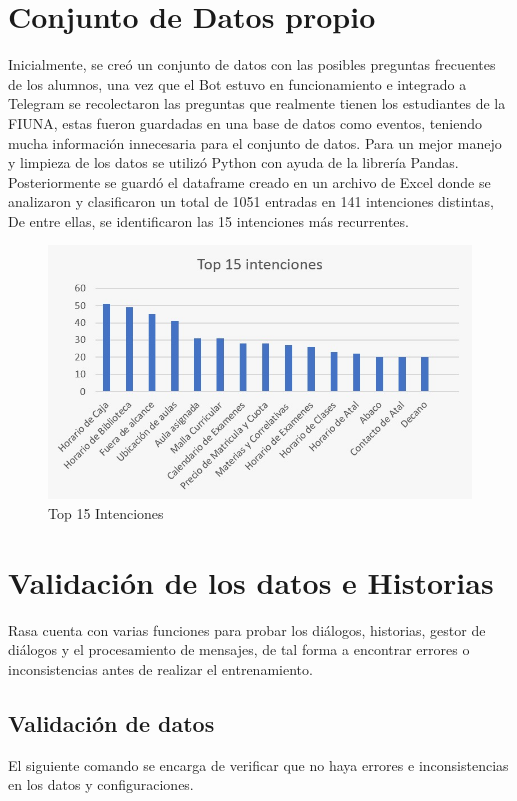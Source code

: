 \section{Conjunto de Datos propio}

Inicialmente, se creó un conjunto de datos con las posibles preguntas frecuentes de los alumnos,
una vez que el Bot estuvo en funcionamiento e integrado a Telegram se recolectaron las preguntas
que realmente tienen los estudiantes de la FIUNA, estas fueron guardadas en una base de datos como
eventos, teniendo mucha información innecesaria para el conjunto de datos. Para un mejor manejo y
limpieza de los datos se utilizó Python con ayuda de la librería Pandas. Posteriormente se guardó
el dataframe creado en un archivo de Excel donde se analizaron y clasificaron un total de 1051
entradas en 141 intenciones distintas, De entre ellas, se identificaron las 15 intenciones más
recurrentes.

\begin{figure}[H]
	\centering
	\includegraphics[width=\textwidth]{imagenes/cap5/Top15intents.jpeg}
	\caption{Top 15 Intenciones}
	\label{fig:Top15intents}
\end{figure}

\section{Validación de los datos e Historias}
Rasa cuenta con varias funciones para probar los diálogos, historias, gestor de diálogos y el
procesamiento de mensajes, de tal forma a encontrar errores o inconsistencias antes de realizar el
entrenamiento.

\subsection{Validación de datos}
El siguiente comando se encarga de verificar que no haya errores e inconsistencias en los datos y
configuraciones.

